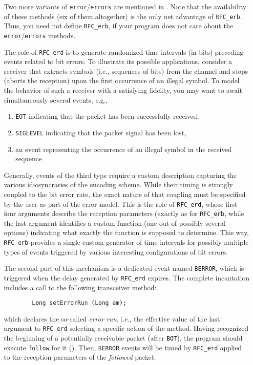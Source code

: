 Two more variants of {\tt error}/{\tt errors} are mentioned in 
.
Note that the availability of
these methods (six of them altogether)
is the only net advantage of {\tt RFC\_erb}.
Thus, you need not define {\tt RFC\_erb}, if your
program does not care about the {\tt error}/{\tt errors} methods.

The role of {\tt RFC\_erd} is to generate randomized time intervals (in bits)
preceding events related to bit errors.
To illustrate its possible applications, consider a receiver that extracts
symbols (i.e., sequences of bits) from the channel and stops (aborts the
reception) upon the first occurrence of an illegal symbol.
To model the behavior of such a receiver with a satisfying fidelity, you may
want to await simultaneously several events, e.g.,
\begin{enumerate}
\item
{\tt EOT} indicating that the packet has been successfully received,
\item
{\tt SIGLEVEL} indicating that the packet signal has been lost,
\item
an event representing the occurrence of an illegal symbol in the received
sequence
\end{enumerate}

Generally, events of the third type require a custom description capturing
the various idiosyncrasies of the encoding scheme.
While their timing is strongly coupled to the bit error rate, the exact
nature of that coupling must be specified by the user as part of the 
error model.
This is the role of {\tt RFC\_erd}, whose first four arguments describe the
reception parameters (exactly as for {\tt RFC\_erb}, while the last argument
identifies a custom function (one out of possibly several options) indicating
what exactly the function is supposed to determine.
This way, {\tt RFC\_erb} provides a single custom generator of time intervals
for possibly multiple types of events triggered by various interesting
configurations of bit errors.

The second part of this mechanism is a dedicated event named {\tt BERROR},
which is triggered when the delay generated by {\tt RFC\_erd} expires.
The complete incantation includes a call to the following transceiver
method:
\begin{verbatim}
        Long setErrorRun (Long em);
\end{verbatim}
\noindent
which declares the so-called {\em error run}, i.e.,
the effective value of the last argument to {\tt RFC\_erd}
selecting a specific action of the method.
Having recognized the beginning of a potentially receivable packet (after
{\tt BOT}), the program should execute {\tt follow} for it
().
Then, {\tt BERROR} events will be timed by {\tt RFC\_erd} applied to the
reception parameters of the {\em followed\/} packet.

